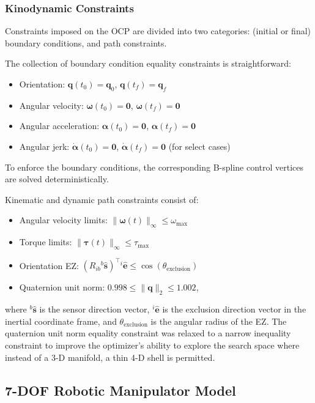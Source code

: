 \subsubsection{Kinodynamic Constraints}
Constraints imposed on the \ac{OCP} are divided into two categories: (initial or final) boundary conditions, and path constraints.

The collection of boundary condition equality constraints is straightforward:
\begin{itemize}
    \item Orientation: $\mathbf{q}(t_0) = \mathbf{q}_0$, $\mathbf{q}(t_f) = \mathbf{q}_f$
    \item Angular velocity: $\boldsymbol{\omega}(t_0) = \mathbf{0}$, $\boldsymbol{\omega}(t_f) = \mathbf{0}$
    \item Angular acceleration: $\boldsymbol{\alpha}(t_0) = \mathbf{0}$, $\boldsymbol{\alpha}(t_f) = \mathbf{0}$
    \item Angular jerk: $\mathbf{\dot{\alpha}}(t_0) = \mathbf{0}$, $\mathbf{\dot{\alpha}}(t_f) = \mathbf{0}$ (for select cases)
\end{itemize}
To enforce the boundary conditions, the corresponding B-spline control vertices are solved deterministically.

Kinematic and dynamic path constraints consist of:
\begin{itemize}
    \item Angular velocity limits: $\lVert \boldsymbol{\omega}(t) \rVert_\infty \leq \omega_{\max}$
    \item Torque limits: $\lVert \boldsymbol{\tau}(t) \rVert_\infty \leq \tau_{\max}$
    \item Orientation \ac{EZ}: $(R_{ib}{}^b\mathbf{\hat{s}})^\top {}^i\mathbf{\hat{e}} \le \cos(\theta_{\text{exclusion}})$
    \item Quaternion unit norm: $0.998 \le \lVert \mathbf{q} \rVert_2 \le 1.002$,
\end{itemize}
where ${}^b\mathbf{\hat{s}}$ is the sensor direction vector, ${}^i\mathbf{\hat{e}}$ is the exclusion direction vector in the inertial coordinate frame, and $\theta_{\text{exclusion}}$ is the angular radius of the \ac{EZ}. 
The quaternion unit norm equality constraint was relaxed to a narrow inequality constraint to improve the optimizer's ability to explore the search space where instead of a 3-D manifold, a thin 4-D shell is permitted.

\subsection{7-\ac{DOF} Robotic Manipulator Model}
\label{sec:methodology_dynamics_arm7_model}

